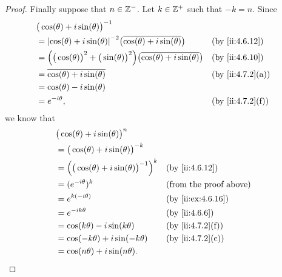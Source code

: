 \begin{proof}
  Finally suppose that \(n \in \mathbb{Z}^-\).
  Let \(k \in \mathbb{Z}^+\) such that \(-k = n\).
  Since
  \begin{align*}
     & \big(\cos(\theta) + i \sin(\theta)\big)^{-1}                                                                                             \\
     & = \abs{\cos(\theta) + i \sin(\theta)}^{-2} \big(\overline{\cos(\theta) + i \sin(\theta)}\big)                      &  & \by{ii:4.6.12}   \\
     & = \Big(\big(\cos(\theta)\big)^2 + \big(\sin(\theta)\big)^2\Big) \big(\overline{\cos(\theta) + i \sin(\theta)}\big) &  & \by{ii:4.6.10}   \\
     & = \overline{\cos(\theta) + i \sin(\theta)}                                                                         &  & \by{ii:4.7.2}[a] \\
     & = \cos(\theta) - i \sin(\theta)                                                                                                          \\
     & = e^{- i \theta},                                                                                                  &  & \by{ii:4.7.2}[f]
  \end{align*}
  we know that
  \begin{align*}
     & \big(\cos(\theta) + i \sin(\theta)\big)^n                                                     \\
     & = \big(\cos(\theta) + i \sin(\theta)\big)^{-k}                                                \\
     & = \Big(\big(\cos(\theta) + i \sin(\theta)\big)^{-1}\Big)^k &  & \by{ii:4.6.12}                \\
     & = (e^{- i \theta})^k                                       &  & \text{(from the proof above)} \\
     & = e^{k (- i \theta)}                                       &  & \by{ii:ex:4.6.16}             \\
     & = e^{- i k \theta}                                         &  & \by{ii:4.6.6}                 \\
     & = \cos(k \theta) - i \sin(k \theta)                        &  & \by{ii:4.7.2}[f]              \\
     & = \cos(- k \theta) + i \sin(- k \theta)                    &  & \by{ii:4.7.2}[c]              \\
     & = \cos(n \theta) + i \sin(n \theta).
  \end{align*}

\end{proof}
